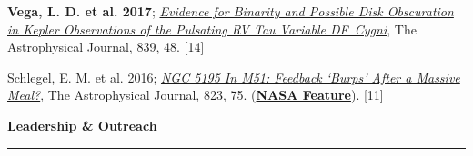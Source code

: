 \documentclass[letter,12pt]{article}
\begin{document}
\begin{etaremune}
\item {\bf Vega, L. D. et al. 2017}; \href{https://ui.adsabs.harvard.edu/abs/2017ApJ...839...48V/abstract}{{\it Evidence for Binarity and Possible Disk Obscuration in Kepler Observations of the Pulsating RV Tau Variable DF~Cygni}}, The Astrophysical Journal, 839, 48. [14]

\item Schlegel, E. M. et al. 2016; \href{https://ui.adsabs.harvard.edu/abs/2016ApJ...823...75S/abstract}{{\it NGC 5195 In M51: Feedback ‘Burps’ After a Massive Meal?}}, The Astrophysical Journal, 823, 75. (\href{https://www.nasa.gov/mission_pages/chandra/nasa-s-chandra-finds-supermassive-black-hole-burping-nearby.html}{\bf NASA Feature}). [11]

\end{etaremune}

\noindent
{\bf Leadership \& Outreach} \\
\vspace{-10mm}
\begin{center}
\rule{\textwidth}{0.2mm}
\end{center}
\vspace{-3mm}
\end{document}
